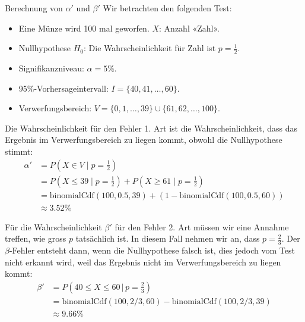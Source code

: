 \clearpage
\begin{bsp}
    {Berechnung von \(\alpha'\) und \(\beta'\)}{}
    Wir betrachten den folgenden Test:
    \begin{itemize}
        \item Eine Münze wird 100 mal geworfen. \( X \): Anzahl «Zahl».
        \item Nullhypothese \( H_0 \): Die Wahrscheinlichkeit für Zahl ist \( p = \frac{1}{2} \).
        \item Signifikanzniveau: \( \alpha = 5\% \).
        \item 95\%-Vorhersageintervall: \( I = \{40, 41, \ldots, 60\} \).
        \item Verwerfungsbereich: \( V = \{0, 1, \ldots, 39\} \cup \{61, 62, \ldots, 100\} \).
    \end{itemize}

    Die Wahrscheinlichkeit für den Fehler 1. Art ist die Wahrscheinlichkeit, dass das Ergebnis im Verwerfungsbereich zu liegen kommt, obwohl die Nullhypothese stimmt:
    \begin{align*}
        \alpha' & = P\left(X \in V \mid p=\frac{1}{2}\right)                                                  \\
                & = P\left(X \leq 39 \mid p=\frac{1}{2}\right) + P\left(X \geq 61 \mid p=\frac{1}{2}\right)   \\
                & = \mathrm{binomialCdf} (100, 0.5, 39) + \left(1 - \mathrm{binomialCdf}(100, 0.5, 60)\right) \\
                & \approx 3.52\%
    \end{align*}

    Für die Wahrscheinlichkeit \(\beta'\) für den Fehler 2. Art müssen wir eine Annahme treffen, wie gross \(p\) tatsächlich ist. In diesem Fall nehmen wir an, dass \(p=\frac{2}{3}\). Der \(\beta\)-Fehler entsteht dann, wenn die Nullhypothese falsch ist, dies jedoch vom Test nicht erkannt wird, weil das Ergebnis nicht im Verwerfungsbereich zu liegen kommt:
    \begin{align*}
        \beta' & = P\left(40 \leq X \leq 60 \,\big|\, p = \tfrac{2}{3}\right)             \\
               & = \mathrm{binomialCdf}(100, 2/3, 60)- \mathrm{binomialCdf}(100, 2/3, 39) \\
               & \approx 9.66\%
    \end{align*}
\end{bsp}


